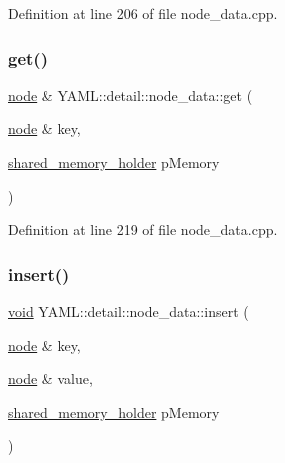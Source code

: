Definition at line 206 of file node\+\_\+data.\+cpp.

\mbox{\label{class_y_a_m_l_1_1detail_1_1node__data_a48cb46dc2d9bd53fc34e2e96828992e9}} 
\subsubsection{\texorpdfstring{get()}{get()}\hspace{0.1cm}{\footnotesize\ttfamily [4/4]}}
{\footnotesize\ttfamily \mbox{\hyperlink{class_y_a_m_l_1_1detail_1_1node}{node}} \& Y\+A\+M\+L\+::detail\+::node\+\_\+data\+::get (\begin{DoxyParamCaption}\item[{\mbox{\hyperlink{class_y_a_m_l_1_1detail_1_1node}{node}} \&}]{key,  }\item[{\mbox{\hyperlink{namespace_y_a_m_l_1_1detail_a228c4b3b6ba1058b474d40afc218e21d}{shared\+\_\+memory\+\_\+holder}}}]{p\+Memory }\end{DoxyParamCaption})}



Definition at line 219 of file node\+\_\+data.\+cpp.

\mbox{\label{class_y_a_m_l_1_1detail_1_1node__data_a85f6c36524a1e159072bd1417eecbf83}} 
\subsubsection{\texorpdfstring{insert()}{insert()}}
{\footnotesize\ttfamily \mbox{\hyperlink{glad_8h_a950fc91edb4504f62f1c577bf4727c29}{void}} Y\+A\+M\+L\+::detail\+::node\+\_\+data\+::insert (\begin{DoxyParamCaption}\item[{\mbox{\hyperlink{class_y_a_m_l_1_1detail_1_1node}{node}} \&}]{key,  }\item[{\mbox{\hyperlink{class_y_a_m_l_1_1detail_1_1node}{node}} \&}]{value,  }\item[{\mbox{\hyperlink{namespace_y_a_m_l_1_1detail_a228c4b3b6ba1058b474d40afc218e21d}{shared\+\_\+memory\+\_\+holder}}}]{p\+Memory }\end{DoxyParamCaption})}



